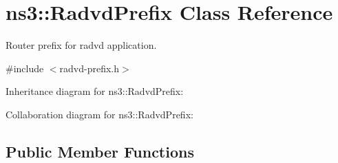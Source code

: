 \hypertarget{classns3_1_1RadvdPrefix}{}\section{ns3\+:\+:Radvd\+Prefix Class Reference}
\label{classns3_1_1RadvdPrefix}


Router prefix for radvd application.  




{\ttfamily \#include $<$radvd-\/prefix.\+h$>$}



Inheritance diagram for ns3\+:\+:Radvd\+Prefix\+:


Collaboration diagram for ns3\+:\+:Radvd\+Prefix\+:
\subsection*{Public Member Functions}
